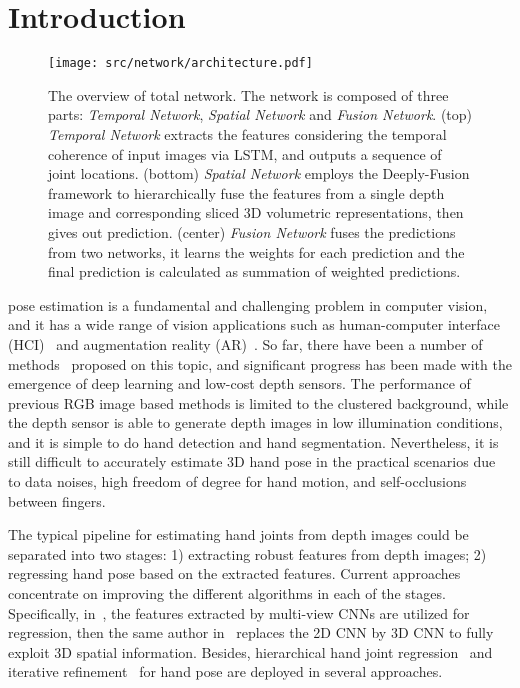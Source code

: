 \documentclass[journal,comsoc]{IEEEtran}
\let\MYoriglatexcaption\caption
\renewcommand{\caption}[2][\relax]{\MYoriglatexcaption[#2]{#2}}
\begin{document}
\section{Introduction}\label{sec:introduction}
\begin{figure*}[htbp]
    \centering
    \texttt{[image: src/network/architecture.pdf]}
    \caption{The overview of total network. The network is composed of three parts: \emph{Temporal Network},
    \emph{Spatial Network} and \emph{Fusion Network}.
    (top) \emph{Temporal Network} extracts the features considering the temporal coherence of input images via LSTM,
    and outputs a sequence of joint locations.
    (bottom) \emph{Spatial Network} employs the Deeply-Fusion
    framework to hierarchically fuse the features from a single depth image and corresponding sliced 3D volumetric representations,
    then gives out prediction.
    (center) \emph{Fusion Network} fuses the predictions from two networks, it learns the weights for each prediction
    and the final prediction is calculated as summation of weighted predictions.}
\label{fig:architecture}
\end{figure*}
 pose estimation is a fundamental and challenging problem in computer vision,
and it has a wide range of vision applications such as human-computer interface
(HCI)~\cite{sato2001real,erol2007vision} and augmentation reality (AR)~\cite{barsoum2016articulated}. So far, there
have been a number of methods~\cite{Ge_2016_CVPR,deng2017hand3d,Ge_2017_CVPR,
sinha2016deephand,sun2015cascaded, wan2016direction,ye2016spatial,li20153d,zhang2016learning,
wang2009real,romero2009monocular,Zimmermann_2017_ICCV,panteleris2017back,oberweger2017deepprior++}
proposed on this topic, and significant progress has been made with the emergence of deep
learning and low-cost depth sensors. The performance of previous RGB image based methods
is limited to the clustered background, while the depth sensor is able to generate depth images in low
illumination conditions, and it is simple to do hand detection and hand segmentation.
Nevertheless, it is still difficult to accurately estimate 3D hand pose in the practical scenarios due
to data noises, high freedom of degree for hand motion, and self-occlusions between fingers.

The typical pipeline for estimating hand joints from depth images could be separated into two stages: 1) extracting robust features
from depth images; 2) regressing hand pose based on the extracted features. Current approaches concentrate on improving the different
algorithms in each of the stages. Specifically, in~\cite{Ge_2016_CVPR}, the features
extracted by multi-view CNNs are utilized for regression, then the same author in~\cite{Ge_2017_CVPR} replaces the 2D CNN by 3D CNN
to fully exploit 3D spatial information. Besides, hierarchical hand joint regression~\cite{ye2016spatial} and iterative
refinement~\cite{oberweger2015hands,oberweger2015training} for hand pose are deployed in several approaches.
\end{document}
